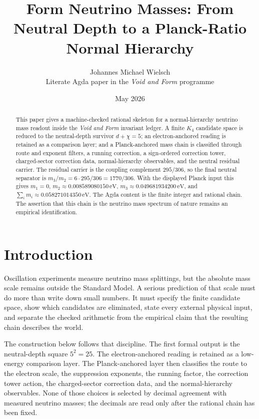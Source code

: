\documentclass[11pt]{article}
\title{Form Neutrino Masses: From Neutral Depth to a Planck-Ratio Normal Hierarchy}
\author{Johannes Michael Wielsch\\
\small Literate Agda paper in the \emph{Void and Form} programme}
\date{May 2026}
\begin{document}
\maketitle

\begin{abstract}
This paper gives a machine-checked rational skeleton for a normal-hierarchy
neutrino mass readout inside the \emph{Void and Form} invariant ledger.  A
finite $K_4$ candidate space is reduced to the neutral-depth survivor
$d+\chi=5$; an electron-anchored reading is retained as a comparison layer;
and a Planck-anchored mass chain is classified through route and exponent
filters, a running correction, a sign-ordered correction tower,
charged-sector correction data, normal-hierarchy observables, and the neutral
residual carrier.  The residual carrier is the coupling complement $295/306$,
so the final neutral separator is
$m_3/m_2 = 6\cdot 295/306 = 1770/306$.  With the displayed Planck input this
gives
$m_1=0$, $m_2\approx 0.008589080150\,\mathrm{eV}$,
$m_3\approx 0.049681934200\,\mathrm{eV}$, and
$\sum_i m_i\approx 0.058271014350\,\mathrm{eV}$.  The Agda content is the
finite integer and rational chain.  The assertion that this chain is the
neutrino mass spectrum of nature remains an empirical identification.
\end{abstract}

\section*{Introduction}

Oscillation experiments measure neutrino mass splittings, but the absolute
mass scale remains outside the Standard Model.  A serious prediction of that
scale must do more than write down small numbers.  It must specify the finite
candidate space, show which candidates are eliminated, state every external
physical input, and separate the checked arithmetic from the empirical claim
that the resulting chain describes the world.

The construction below follows that discipline.  The first formal output is
the neutral-depth square $5^2=25$.  The electron-anchored reading is retained
as a low-energy comparison layer.  The Planck-anchored layer then classifies
the route to the electron scale, the suppression exponents, the running
factor, the correction tower action, the charged-sector correction data, and
the normal-hierarchy observables.  None of those choices is selected by
decimal agreement with measured neutrino masses; the decimals are read only
after the rational chain has been fixed.
\end{document}
